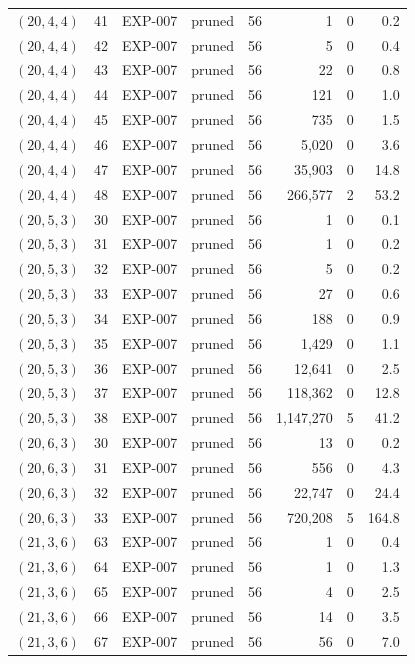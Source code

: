 \begin{longtable}{lrllrrrr}
$(20,4,4)$ & 41 & EXP-007 & pruned & 56 & 1 & 0 & 0.2 \\
$(20,4,4)$ & 42 & EXP-007 & pruned & 56 & 5 & 0 & 0.4 \\
$(20,4,4)$ & 43 & EXP-007 & pruned & 56 & 22 & 0 & 0.8 \\
$(20,4,4)$ & 44 & EXP-007 & pruned & 56 & 121 & 0 & 1.0 \\
$(20,4,4)$ & 45 & EXP-007 & pruned & 56 & 735 & 0 & 1.5 \\
$(20,4,4)$ & 46 & EXP-007 & pruned & 56 & 5{,}020 & 0 & 3.6 \\
$(20,4,4)$ & 47 & EXP-007 & pruned & 56 & 35{,}903 & 0 & 14.8 \\
$(20,4,4)$ & 48 & EXP-007 & pruned & 56 & 266{,}577 & 2 & 53.2 \\
$(20,5,3)$ & 30 & EXP-007 & pruned & 56 & 1 & 0 & 0.1 \\
$(20,5,3)$ & 31 & EXP-007 & pruned & 56 & 1 & 0 & 0.2 \\
$(20,5,3)$ & 32 & EXP-007 & pruned & 56 & 5 & 0 & 0.2 \\
$(20,5,3)$ & 33 & EXP-007 & pruned & 56 & 27 & 0 & 0.6 \\
$(20,5,3)$ & 34 & EXP-007 & pruned & 56 & 188 & 0 & 0.9 \\
$(20,5,3)$ & 35 & EXP-007 & pruned & 56 & 1{,}429 & 0 & 1.1 \\
$(20,5,3)$ & 36 & EXP-007 & pruned & 56 & 12{,}641 & 0 & 2.5 \\
$(20,5,3)$ & 37 & EXP-007 & pruned & 56 & 118{,}362 & 0 & 12.8 \\
$(20,5,3)$ & 38 & EXP-007 & pruned & 56 & 1{,}147{,}270 & 5 & 41.2 \\
$(20,6,3)$ & 30 & EXP-007 & pruned & 56 & 13 & 0 & 0.2 \\
$(20,6,3)$ & 31 & EXP-007 & pruned & 56 & 556 & 0 & 4.3 \\
$(20,6,3)$ & 32 & EXP-007 & pruned & 56 & 22{,}747 & 0 & 24.4 \\
$(20,6,3)$ & 33 & EXP-007 & pruned & 56 & 720{,}208 & 5 & 164.8 \\
$(21,3,6)$ & 63 & EXP-007 & pruned & 56 & 1 & 0 & 0.4 \\
$(21,3,6)$ & 64 & EXP-007 & pruned & 56 & 1 & 0 & 1.3 \\
$(21,3,6)$ & 65 & EXP-007 & pruned & 56 & 4 & 0 & 2.5 \\
$(21,3,6)$ & 66 & EXP-007 & pruned & 56 & 14 & 0 & 3.5 \\
$(21,3,6)$ & 67 & EXP-007 & pruned & 56 & 56 & 0 & 7.0 \\

\end{longtable}
